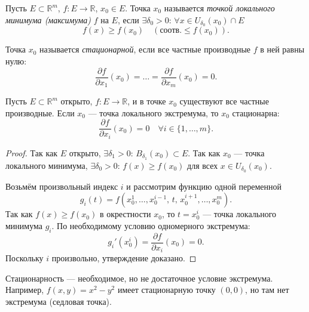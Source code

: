


\begin{defn}
  Пусть $E \subset \mathbb{R}^m$, $f: E \to \mathbb{R}$, $x_0 \in E$.
  Точка $x_0$ называется \emph{точкой локального минимума (максимума)} $f$ на $E$, если
  $\exists\delta_0 > 0$: $\forall x \in U_{\delta_0}(x_0) \cap E$
  \[
    f(x) \geq f(x_0) \quad (\text{соотв.} \leq f(x_0)).
  \]
\end{defn}

\begin{defn}
  Точка $x_0$ называется \emph{стационарной}, если все частные производные $f$ в ней равны нулю:
  \[
    \frac{\partial f}{\partial x_1}(x_0) = \ldots = \frac{\partial f}{\partial x_m}(x_0) = 0.
  \]
\end{defn}

\begin{theorem}
  Пусть $E \subset \mathbb{R}^m$ открыто, $f: E \to \mathbb{R}$,
  и в точке $x_0$ существуют все частные производные.
  Если $x_0$ --- точка локального экстремума, то $x_0$ стационарна:
  \[
    \frac{\partial f}{\partial x_i}(x_0) = 0 \quad \forall i \in \{1,\ldots,m\}.
  \]
  \begin{proof}
    Так как $E$ открыто, $\exists\delta_1 > 0$: $B_{\delta_1}(x_0) \subset E$.
    Так как $x_0$ --- точка локального минимума, $\exists\delta_0 > 0$:
    $f(x) \geq f(x_0)$ для всех $x \in U_{\delta_0}(x_0)$.

    Возьмём произвольный индекс $i$ и рассмотрим функцию одной переменной
    \[
      g_i(t) = f(x_0^1, \ldots, x_0^{i-1},\, t,\, x_0^{i+1}, \ldots, x_0^m).
    \]
    Так как $f(x) \geq f(x_0)$ в окрестности $x_0$, то $t = x_0^i$ --- точка
    локального минимума $g_i$. По необходимому условию одномерного экстремума:
    \[
      g_i'(x_0^i) = \frac{\partial f}{\partial x_i}(x_0) = 0.
    \]
    Поскольку $i$ произвольно, утверждение доказано. \qedhere
  \end{proof}
\end{theorem}

\begin{note}
  Стационарность --- необходимое, но не достаточное условие экстремума.
  Например, $f(x,y) = x^2 - y^2$ имеет стационарную точку $(0,0)$, но там нет экстремума (седловая точка).
\end{note}

